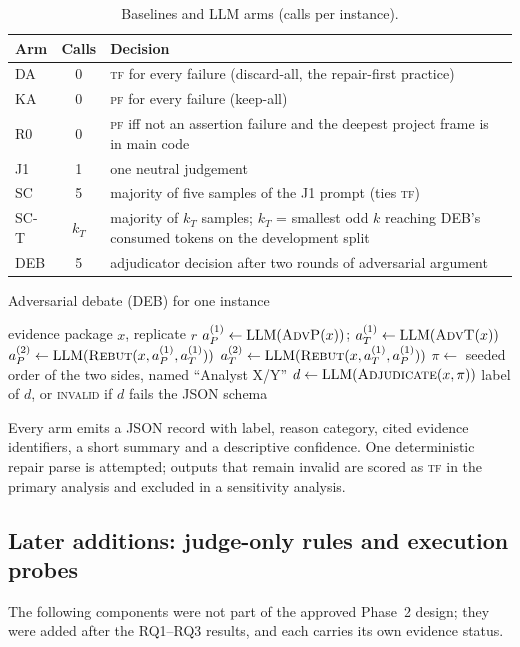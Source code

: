 \documentclass[journal]{IEEEtran}
\newcommand{\PF}{\textsc{pf}}
\newcommand{\TF}{\textsc{tf}}
\begin{document}
\begin{table}[t]
\caption{Baselines and LLM arms (calls per instance).}\label{tab:arms}
\footnotesize
\begin{tabularx}{\columnwidth}{@{}l c Y@{}}
\toprule
Arm & Calls & Decision \\
\midrule
DA & 0 & \TF{} for every failure (discard-all, the repair-first practice) \\
KA & 0 & \PF{} for every failure (keep-all) \\
R0 & 0 & \PF{} iff not an assertion failure and the deepest project frame is in main code \\
J1 & 1 & one neutral judgement \\
SC & 5 & majority of five samples of the J1 prompt (ties \TF) \\
SC-T & $k_T$ & majority of $k_T$ samples; $k_T$ = smallest odd $k$ reaching DEB's consumed tokens on the development split \\
DEB & 5 & adjudicator decision after two rounds of adversarial argument \\
\bottomrule
\end{tabularx}
\end{table}

\begin{algorithm}[t]
\caption{Adversarial debate (DEB) for one instance}\label{alg:deb}
\begin{algorithmic}[1]
\Require evidence package $x$, replicate $r$
\State $a_P^{(1)} \gets \mathrm{LLM}(\textsc{AdvP}(x))$; $a_T^{(1)} \gets \mathrm{LLM}(\textsc{AdvT}(x))$ 
\State $a_P^{(2)} \gets \mathrm{LLM}(\textsc{Rebut}(x, a_P^{(1)}, a_T^{(1)}))$
\State $a_T^{(2)} \gets \mathrm{LLM}(\textsc{Rebut}(x, a_T^{(1)}, a_P^{(1)}))$
\State $\pi \gets$ seeded order of the two sides, named ``Analyst X/Y''
\State $d \gets \mathrm{LLM}(\textsc{Adjudicate}(x, \pi))$ 
\State \Return label of $d$, or \textsc{invalid} if $d$ fails the JSON schema
\end{algorithmic}
\end{algorithm}

Every arm emits a JSON record with label, reason category, cited evidence identifiers, a short summary and a descriptive confidence. One deterministic repair parse is attempted; outputs that remain invalid are scored as \TF{} in the primary analysis and excluded in a sensitivity analysis.

\subsection{Later additions: judge-only rules and execution probes}\label{sec:probes}
The following components were not part of the approved Phase~2 design; they were added after the RQ1--RQ3 results, and each carries its own evidence status.
\end{document}
